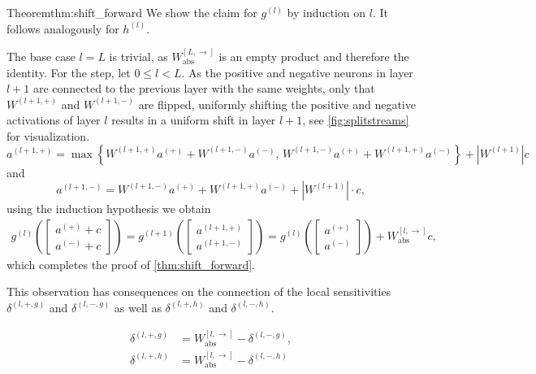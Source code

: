 \begin{proofref}{Theorem}{thm:shift_forward}
    We show the claim for $g^{(l)}$ by induction on $l$. It follows analogously for $h^{(l)}$.

    The base case $l = L$ is trivial, as $W_{\text{abs}}^{[L, \rightarrow]}$ is an empty product and therefore the identity.
    For the step, let $0 \leq l < L$.
    As the positive and negative neurons in layer $l+1$ are connected to the previous layer with the same weights,
    only that $W^{(l+1, +)}$ and $W^{(l+1, -)}$ are flipped, uniformly shifting the positive and negative activations of layer $l$ results in a uniform shift in layer $l+1$, see \cref{fig:splitstreams} for visualization.
    \[
    a^{(l+1, +)} 
      = \max\!\left\{
        W^{(l+1, +)} a^{(+)} + W^{(l+1, -)} a^{(-)}, \,
        W^{(l+1, -)} a^{(+)} + W^{(l+1, +)} a^{(-)}
      \right\} 
      + \left|W^{(l+1)}\right| c
    \]
    and
    \[
    a^{(l+1, -)} 
      = W^{(l+1, -)} a^{(+)} + W^{(l+1, +)} a^{(-)} 
      + \left|W^{(l+1)}\right| \cdot c,
    \]
    using the induction hypothesis we obtain
    \begin{align}
        g^{(l)}\!\left( \begin{bmatrix} a^{(+)} + c \\ a^{(-)} + c \end{bmatrix} \right)
            = g^{(l+1)}\!\left( \begin{bmatrix} a^{(l+1, +)} \\ a^{(l+1, -)} \end{bmatrix} \right)
            = g^{(l)}\!\left( \begin{bmatrix} a^{(+)} \\ a^{(-)} \end{bmatrix} \right) 
               + W_{\text{abs}}^{[l, \rightarrow]} c,
    \end{align}
    which completes the proof of \cref{thm:shift_forward}.
\end{proofref}

This observation has consequences on the connection of the local sensitivities $\delta^{(l, +, g)}$ and $\delta^{(l, -, g)}$ as well as $\delta^{(l, +, h)}$ and $\delta^{(l, -, h)}$.

\begin{theorem} \label{thm:delta_pos_neg_connection}
    \begin{align}
        \delta^{(l,+,g)} &= W_{\text{abs}}^{[l, \rightarrow]} - \delta^{(l,-,g)}, \\
        \delta^{(l,+,h)} &= W_{\text{abs}}^{[l, \rightarrow]} - \delta^{(l,-,h)}
    \end{align}
\end{theorem}

